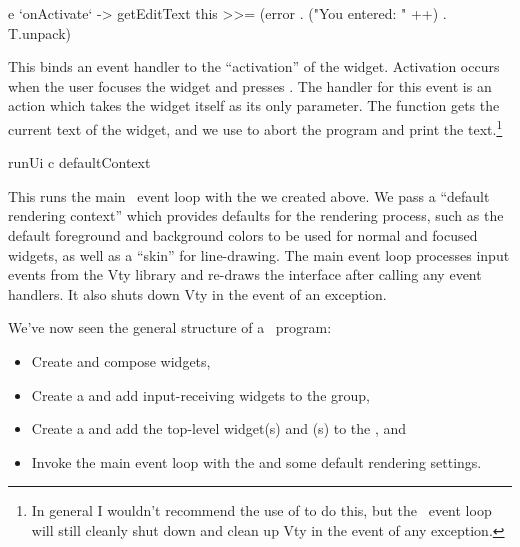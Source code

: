 \begin{haskellcode}
 e `onActivate` \this -> getEditText this >>=
   (error . ("You entered: " ++) . T.unpack)
\end{haskellcode}

This binds an event handler to the ``activation'' of the 
widget.  Activation occurs when the user focuses the  widget
and presses .  The handler for this event is an 
action which takes the  widget itself as its only parameter.
The  function gets the current text of the 
widget, and we use  to abort the program and print the
text.\footnote{In general I wouldn't recommend the use of 
  to do this, but the \vtyui\ event loop will still cleanly shut down
  and clean up Vty in the event of any exception.}

\begin{haskellcode}
 runUi c defaultContext
\end{haskellcode}

This runs the main \vtyui\ event loop with the  we
created above.  We pass a ``default rendering context'' which provides
defaults for the rendering process, such as the default foreground and
background colors to be used for normal and focused widgets, as well
as a “skin” for line-drawing.  The main event loop processes input
events from the Vty library and re-draws the interface after calling
any event handlers.  It also shuts down Vty in the event of an
exception.

We've now seen the general structure of a \vtyui\ program:
\begin{itemize}
\item Create and compose widgets,
\item Create a  and add input-receiving widgets to the
  group,
\item Create a  and add the top-level widget(s) and
  (s) to the , and
\item Invoke the main event loop with the  and some
  default rendering settings.
\end{itemize}
